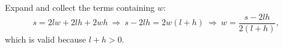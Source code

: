 Expand and collect the terms containing $w$:
\[
s=2lw+2lh+2wh\ \Rightarrow\ s-2lh=2w(l+h)\ \Rightarrow\ \boxed{w=\dfrac{s-2lh}{2(l+h)}},
\]
which is valid because $l+h>0$.
